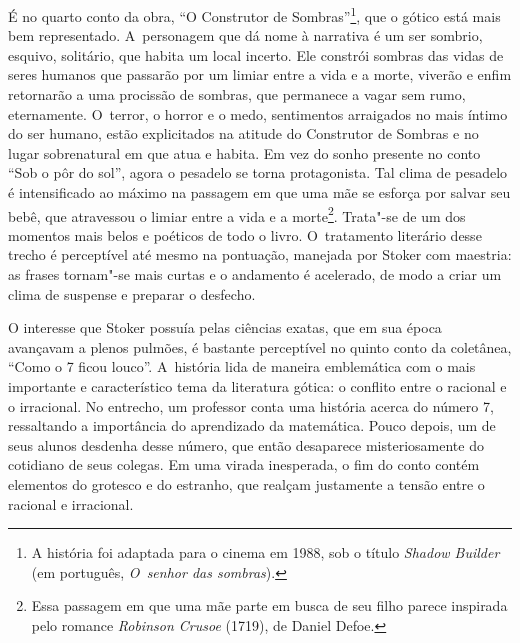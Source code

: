 É no quarto conto da obra, ``O Construtor de Sombras''\footnote{A história foi adaptada para o cinema em
1988, sob o título \emph{Shadow Builder} (em português, \emph{O~senhor
das sombras}).}, que o gótico está mais bem representado. A~personagem que dá nome à narrativa é um ser sombrio, esquivo, solitário,
que habita um local incerto. Ele constrói sombras das vidas de seres
humanos que passarão por um limiar entre a vida e a morte, viverão e
enfim retornarão a uma procissão de sombras, que permanece a vagar sem
rumo, eternamente. O~terror, o horror e o medo, sentimentos arraigados
no mais íntimo do ser humano, estão explicitados na atitude do
Construtor de Sombras e no lugar sobrenatural em que atua e habita. Em
vez do sonho presente no conto ``Sob o pôr do sol'', agora o pesadelo se
torna protagonista. Tal clima de pesadelo é intensificado ao máximo na
passagem em que uma mãe se esforça por salvar seu bebê, que atravessou o
limiar entre a vida e a morte\footnote{Essa passagem em que uma mãe parte em busca
de seu filho parece inspirada pelo romance \emph{Robinson Crusoe}
(1719), de Daniel Defoe.}. Trata"-se de um
dos momentos mais belos e poéticos de todo o livro. O~tratamento
literário desse trecho é perceptível até mesmo na pontuação, manejada
por Stoker com maestria: as frases tornam"-se mais curtas e o andamento é
acelerado, de modo a criar um clima de suspense e preparar o desfecho.

O interesse que Stoker possuía pelas ciências exatas, que em sua época
avançavam a plenos pulmões, é bastante perceptível no quinto conto da
coletânea, ``Como o 7 ficou louco''. A~história lida de maneira
emblemática com o mais importante e característico tema da literatura
gótica: o conflito entre o racional e o irracional. No entrecho, um
professor conta uma história acerca do número 7, ressaltando a
importância do aprendizado da matemática. Pouco depois, um de seus
alunos desdenha desse número, que então desaparece misteriosamente do cotidiano
de seus colegas. Em uma virada inesperada, o fim do conto contém
elementos do grotesco e do estranho, que realçam justamente a tensão
entre o racional e irracional.


